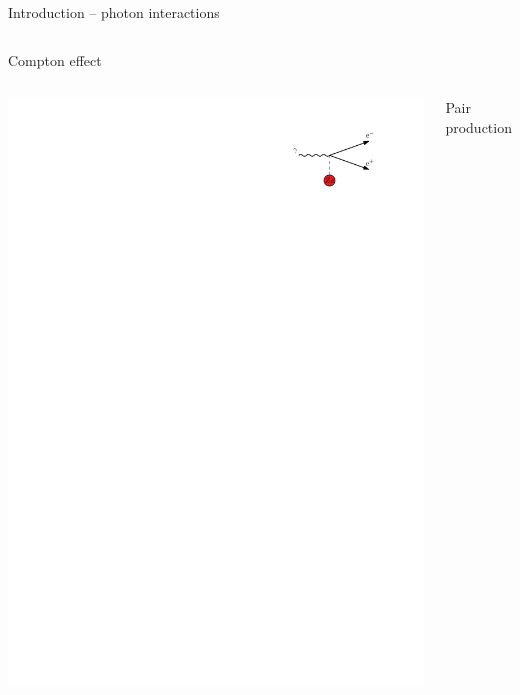 \documentclass[11pt,xcolor=dvipsnames,professionalfonts,notes]{beamer}
\begin{document}
\begin{frame}{Introduction -- photon interactions}
\begin{columns}
		Compton effect
	\end{columns}
	\vspace{0.2cm}
	\begin{columns}
		\begin{center}
			\includegraphics{./figures/pair_intro.pdf}
		\end{center}
		
		Pair production
	\end{columns}
\end{frame}
\end{document}
